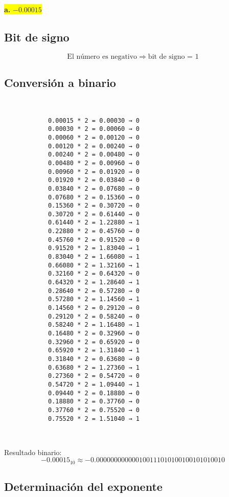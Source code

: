 \documentclass[a4paper,12pt]{article}
\begin{document}
		\begin{center}	
		\colorbox{yellow}{{\textbf{a.} $-0.00015$}}
		
		\subsection*{Bit de signo}
		
		\[
		\text{El número es negativo} \Rightarrow \text{bit de signo = } \boxed{1}
		\]
		
		\subsection*{Conversión a binario}
		
		
	~~~~~~~~~~~~~~~~~~~~~~~~~ 
		\newline
		
		
		\begin{center}
		\begin{Verbatim}
			0.00015 * 2 = 0.00030 → 0 
			0.00030 * 2 = 0.00060 → 0 
			0.00060 * 2 = 0.00120 → 0 
			0.00120 * 2 = 0.00240 → 0 
			0.00240 * 2 = 0.00480 → 0 
			0.00480 * 2 = 0.00960 → 0 
			0.00960 * 2 = 0.01920 → 0 
			0.01920 * 2 = 0.03840 → 0 
			0.03840 * 2 = 0.07680 → 0 
			0.07680 * 2 = 0.15360 → 0 
			0.15360 * 2 = 0.30720 → 0 
			0.30720 * 2 = 0.61440 → 0 
			0.61440 * 2 = 1.22880 → 1 
			0.22880 * 2 = 0.45760 → 0 
			0.45760 * 2 = 0.91520 → 0 
			0.91520 * 2 = 1.83040 → 1 
			0.83040 * 2 = 1.66080 → 1 
			0.66080 * 2 = 1.32160 → 1 
			0.32160 * 2 = 0.64320 → 0 
			0.64320 * 2 = 1.28640 → 1 
			0.28640 * 2 = 0.57280 → 0 
			0.57280 * 2 = 1.14560 → 1 
			0.14560 * 2 = 0.29120 → 0 
			0.29120 * 2 = 0.58240 → 0 
			0.58240 * 2 = 1.16480 → 1 
			0.16480 * 2 = 0.32960 → 0 
			0.32960 * 2 = 0.65920 → 0 
			0.65920 * 2 = 1.31840 → 1 
			0.31840 * 2 = 0.63680 → 0 
			0.63680 * 2 = 1.27360 → 1 
			0.27360 * 2 = 0.54720 → 0 
			0.54720 * 2 = 1.09440 → 1 
			0.09440 * 2 = 0.18880 → 0 
			0.18880 * 2 = 0.37760 → 0 
			0.37760 * 2 = 0.75520 → 0 
			0.75520 * 2 = 1.51040 → 1 
			
						
		\end{Verbatim}
		\end{center}
	
		Resultado binario: 
		\[
		-0.00015_{10} \approx -0.000000000000100111010100100101010010
		\]
		
		\subsection*{Determinación del exponente}
		

\end{center}
\end{document}
